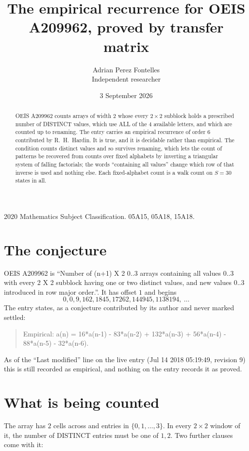 \documentclass[11pt,a4paper]{article}
\title{The empirical recurrence for OEIS A209962, proved by transfer matrix}
\author{Adrian Perez Fontelles\\ \small Independent researcher}
\date{3 September 2026}
\theoremstyle{plain}
\theoremstyle{definition}
\begin{document}
\maketitle

\begin{abstract}
OEIS A209962 counts arrays of width $2$ whose every $2\times2$ subblock holds a
prescribed number of DISTINCT values, which use ALL of the $4$ available letters, and which
are counted up to renaming. The entry carries an empirical recurrence of order $6$
contributed by R.~H.~Hardin. It is true, and it is decidable rather than empirical. The
condition counts distinct values and so survives renaming, which lets the count of patterns be
recovered from counts over fixed alphabets by inverting a triangular system of falling
factorials; the words ``containing all values'' change which row of that inverse is used and
nothing else. Each fixed-alphabet count is a walk count on $S=30$ states in all.
\end{abstract}

\noindent\small 2020 Mathematics Subject Classification. 05A15, 05A18, 15A18.\normalsize

\section{The conjecture}

OEIS A209962 is ``Number of (n+1) X 2 0..3 arrays containing all values 0..3 with every 2 X 2 subblock having one or two distinct values, and new values 0..3 introduced in row major order.''. It has offset $1$ and begins
\[
0, 0, 9, 162, 1845, 17262, 144945, 1138194,\ \dots
\]
The entry states, as a conjecture contributed by its author and never marked settled:
\begin{quote}
Empirical: a(n) = 16*a(n-1) - 83*a(n-2) + 132*a(n-3) + 56*a(n-4) - 88*a(n-5) - 32*a(n-6).
\end{quote}
As of the ``Last modified'' line on the live entry (Jul 14 2018 05:19:49, revision 9) this is still
recorded as empirical, and nothing on the entry records it as proved.

\section{What is being counted}

The array has $2$ cells across and entries in $\{0,1,\dots,3\}$. In every
$2\times2$ window of it, the number of DISTINCT entries must be one of $1, 2$. Two
further clauses come with it:
\end{document}
